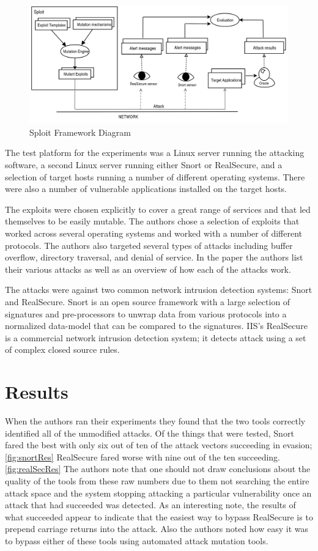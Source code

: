 \documentclass{reading_glasses}
\begin{document}
\begin{figure}
	\centering
	\includegraphics[width=1.0\textwidth]{SploitFramework.png}
	\caption{Sploit Framework Diagram}
	\label{fig:sploitF}
\end{figure}

The test platform for the experiments was a Linux server running the attacking software, a second Linux server running either Snort or RealSecure, and a selection of target hosts running a number of different operating systems.  There were also a number of vulnerable applications installed on the target hosts.

The exploits were chosen explicitly to cover a great range of services and that led themselves to be easily mutable.  The authors chose a selection of exploits that worked across several operating systems and worked with a number of different protocols.  The authors also targeted several types of attacks including buffer overflow, directory traversal, and denial of service.  In the paper the authors list their various attacks as well as an overview of how each of the attacks work.

The attacks were against two common network intrusion detection systems: Snort and RealSecure.  Snort is an open source framework with a large selection of signatures and pre-processors to unwrap data from various protocols into a normalized data-model that can be compared to the signatures.  IIS’s RealSecure is a commercial network intrusion detection system; it detects attack using a set of complex closed source rules.

\section{Results}
When the authors ran their experiments they found that the two tools correctly identified all of the unmodified attacks.   Of the things that were tested, Snort fared the best with only six out of ten of the attack vectors succeeding in evasion; \ref{fig:snortRes} RealSecure fared worse with nine out of the ten succeeding. \ref{fig:realSecRes}  The authors note that one should not draw conclusions about the quality of the tools from these raw numbers due to them not searching the entire attack space and the system stopping attacking a particular vulnerability once an attack that had succeeded was detected.  As an interesting note, the results of what succeeded appear to indicate that the easiest way to bypass RealSecure is to prepend carriage returns into the attack.   Also the authors noted how easy it was to bypass either of these tools using automated attack mutation tools.  
\end{document}
